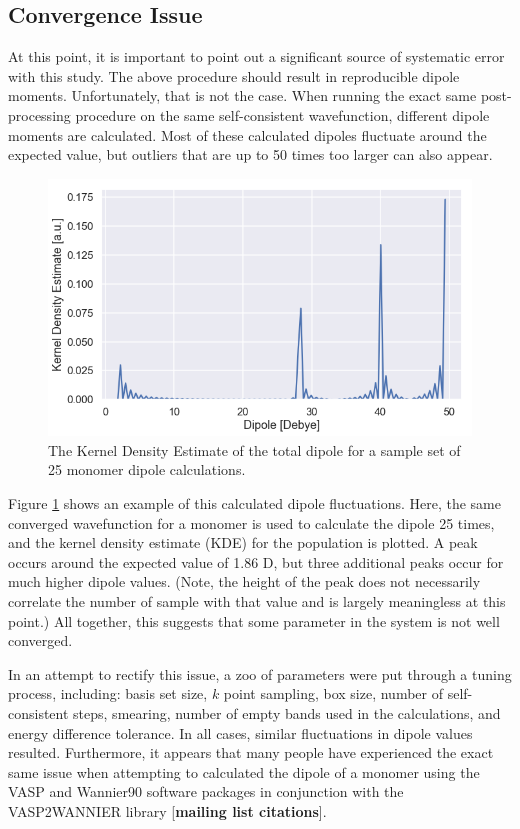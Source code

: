         \subsection{Convergence Issue} 
        At this point, it is important to point out a significant source of systematic error with this study. The above procedure should result in reproducible dipole moments. Unfortunately, that is not the case. When running the exact same post-processing procedure on the same self-consistent wavefunction, different dipole moments are calculated. Most of these calculated dipoles fluctuate around the expected value, but outliers that are up to 50 times too larger can also appear.
        
        \begin{figure}
            \centering
            \includegraphics[width=0.9\linewidth]{Figures/System/pc_bad_convergence.png}
            \caption{The Kernel Density Estimate of the total dipole for a sample set of 25 monomer dipole calculations.}
            \label{fig:pc_bad_convergence}
        \end{figure}
        
        Figure \ref{fig:pc_bad_convergence} shows an example of this calculated dipole fluctuations. Here, the same converged wavefunction for a monomer is used to calculate the dipole 25 times, and the kernel density estimate (KDE) for the population is plotted. A peak occurs around the expected value of 1.86 D, but three additional peaks occur for much higher dipole values. (Note, the height of the peak does not necessarily correlate the number of sample with that value and is largely meaningless at this point.) All together, this suggests that some parameter in the system is not well converged.
        
        In an attempt to rectify this issue, a zoo of parameters were put through a tuning process, including: basis set size, $k$ point sampling, box size, number of self-consistent steps, smearing, number of empty bands used in the calculations, and energy difference tolerance. In all cases, similar fluctuations in dipole values resulted. Furthermore, it appears that many people have experienced the exact same issue when attempting to calculated the dipole of a monomer using the VASP and Wannier90 software packages in conjunction with the VASP2WANNIER library [\textbf{mailing list citations}]. 
        
